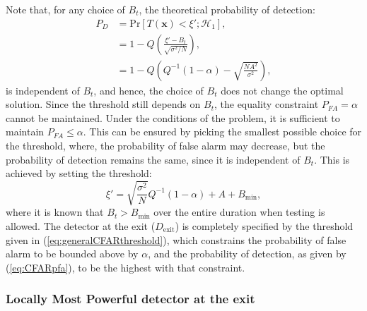 \documentclass[11pt]{article}
\newcommand{\bx}{\mathbf{x}}
\newcommand{\cH}{\mathcal{H}}
\newcommand{\Prob}{\mathrm{Pr}}
\begin{document}
Note that, for any choice of $B_{t}$, the theoretical probability of detection:
\begin{equation}
\begin{split}
	P_{D} &= \Prob[T(\bx) < \xi';\cH_{1}], \\
	&= 1-Q\left( \frac{\xi'-B_{t}}{\sqrt{\sigma^{2}/N}} \right), \\
	&= 1-Q\left( Q^{-1}(1-\alpha) -\sqrt{\frac{NA^{2}}{\sigma^{2}}} \right),
\end{split}
\label{eq:CFARpfa}
\end{equation}
is independent of $B_{t}$, and hence, the choice of $B_{t}$ does not change the optimal solution. Since the threshold still depends on $B_{t}$, the equality constraint $P_{FA}=\alpha$ cannot be maintained. Under the conditions of the problem, it is sufficient to maintain $P_{FA} \leq \alpha$. This can be ensured by picking the smallest possible choice for the threshold, where, the probability of false alarm may decrease, but the probability of detection remains the same, since it is independent of $B_{t}$. This is achieved by setting the threshold:
\begin{equation}
	\xi' = \sqrt{\frac{\sigma^{2}}{N}} Q^{-1}(1-\alpha) + A + B_{\text{min}},
\label{eq:generalCFARthreshold}
\end{equation}
where it is known that $B_{t}>B_{\text{min}}$ over the entire duration when testing is allowed. The detector at the exit ($D_{\text{exit}}$) is completely specified by the threshold given in (\ref{eq:generalCFARthreshold}), which constrains the probability of false alarm to be bounded above by $\alpha$, and the probability of detection, as given by (\ref{eq:CFARpfa}), to be the highest with that constraint.


\subsubsection{Locally Most Powerful detector at the exit}
\label{subsubsec:exitLMPdetector}
\end{document}
